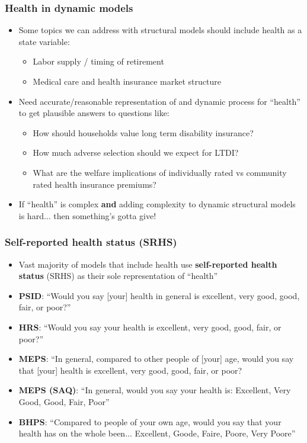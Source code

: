 \documentclass[aspectratio=169]{beamer}
\begin{document}
\begin{frame}\frametitle{Health in dynamic models}
\begin{itemize}
	\item <1->Some topics we can address with structural models should include health as a state variable:
	\begin{itemize}
		\item <1->Labor supply / timing of retirement
		
		\item <1->Medical care and health insurance market structure
	\end{itemize}

	\item <2->Need accurate/reasonable representation of and dynamic process for ``health'' to get plausible answers to questions like:
	\begin{itemize}
		\item <2->How should households value long term disability insurance?
		
		\item <3->How much adverse selection should we expect for LTDI?
		
		\item <4->What are the welfare implications of individually rated vs community rated health insurance premiums?
	\end{itemize}

	\item <5->If ``health'' is complex \textbf{and} adding complexity to dynamic structural models is hard... then something's gotta give! 
\end{itemize}
\end{frame}


\begin{frame}\frametitle{Self-reported health status (SRHS)}
\begin{itemize}
	\item <1->Vast majority of models that include health use \textbf{self-reported health status} (SRHS) as their sole representation of ``health''
	
	\item <2->\textbf{PSID}: ``Would you say [your] health in general is excellent, very good, good, fair, or poor?''
	
	\item <2->\textbf{HRS}: ``Would you say your health is excellent, very good, good, fair, or poor?''
	
	\item <3->\textbf{MEPS}: ``In general, compared to other people of [your] age, would
	you say that [your] health is excellent, very good, good,
	fair, or poor?
	
	\item <2->\textbf{MEPS (SAQ)}: ``In general, would you say your health is: Excellent, Very Good, Good, Fair, Poor''
	
	\item <4->\textbf{BHPS}: ``Compared to people of your own age, would you say that your health has on the whole been... Excellent, Goode, Faire, Poore, Very Poore''
\end{itemize}
\end{frame}
\end{document}
